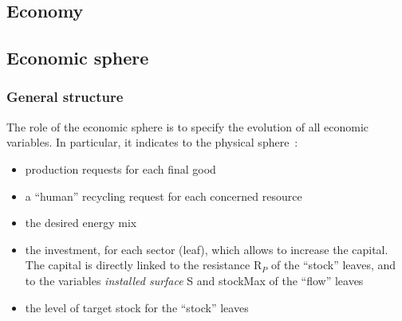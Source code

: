 \documentclass[12pt,a4paper]{article}%
\begin{document}
\begin{appendix}
\section{Economy}
\subsection{Economic sphere} 
\subsubsection{{General structure}}  
The role of the economic sphere is to specify the evolution of all economic variables. In particular, it indicates to the physical sphere~:  
\begin{itemize} 
	\item production requests for each final good 
	\item a ``human'' recycling request for each concerned resource 
	\item the desired energy mix 
	\item the investment, for each sector (leaf), which allows to increase the capital. The capital is directly linked to the resistance R$_{P}$ of the ``stock'' leaves, and to the variables \textit{installed surface} S and stockMax of the ``flow'' leaves 
	\item the level of target stock for the ``stock'' leaves 
\end{itemize} 


\end{appendix}
\end{document}
